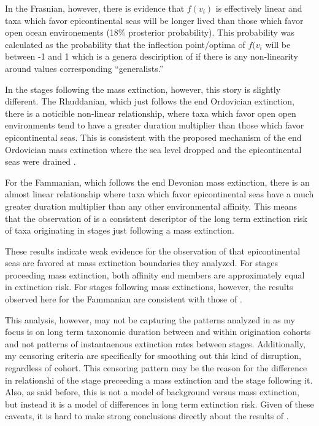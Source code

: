 \documentclass[12pt,letterpaper]{article}
\begin{document}
In the Frasnian, however, there is evidence that \(f(v_{i})\) is effectively linear and taxa which favor epicontinental seas will be longer lived than those which favor open ocean environements (18\% prosterior probability). This probability was calculated as the probability that the inflection point/optima of \(f(v_{i}\) will be between -1 and 1 which is a genera desciription of if there is any non-linearity around values corresponding ``generalists.''

In the stages following the mass extinction, however, this story is slightly different. The Rhuddanian, which just follows the end Ordovician extinction, there is a noticible non-linear relationship, where taxa which favor open open environments tend to have a greater duration multiplier than those which favor epicontinental seas. This is consistent with the proposed mechanism of the end Ordovician mass extinction where the sea level dropped and the epicontinental seas were drained \citep{Johnson1974,Sheehan2001b}. 

For the Fammanian, which follows the end Devonian mass extinction, there is an almost linear relationship where taxa which favor epicontinental seas have a much greater duration multiplier than any other environmental affinity. This means that the observation of \citet{Miller2009a} is a consistent descriptor of the long term extinction risk of taxa originating in stages just following a mass extinction.

These results indicate weak evidence for the observation of \citet{Miller2009a} that epicontinental seas are favored at mass extinction boundaries they analyzed. For stages proceeding mass extinction, both affinity end members are approximately equal in extinction risk. For stages following mass extinctions, however, the results observed here for the Fammanian are consistent with those of \citet{Miller2009a}.

This analysis, however, may not be capturing the patterns analyzed in \citet{Miller2009a} as my focus is on long term taxonomic duration between and within origination cohorts and not patterns of instantaenous extinction rates between stages. Additionally, my censoring criteria are specifically for smoothing out this kind of disruption, regardless of cohort. This censoring pattern may be the reason for the difference in relationshi of the stage preceeding a mass extinction and the stage following it. Also, as said before, this is not a model of background versus mass extinction, but instead it is a model of differences in long term extinction risk. Given of these caveats, it is hard to make strong conclusions directly about the results of \citet{Miller2009a}.
\end{document}
